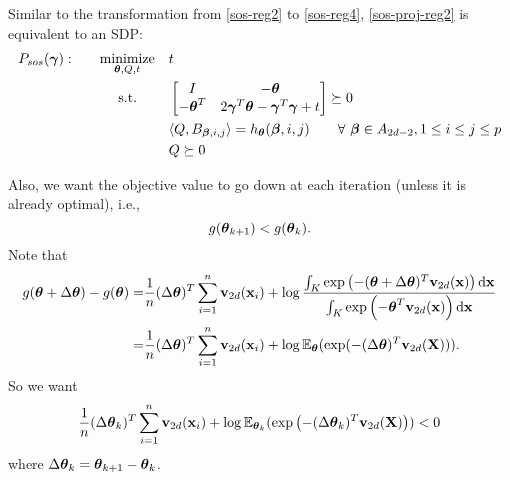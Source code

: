 \documentclass[11pt]{article}
\begin{document}
Similar to the transformation from \eqref{sos-reg2} to \eqref{sos-reg4}, \eqref{sos-proj-reg2} is equivalent to an SDP:
\begin{equation} \label{sos-proj-reg3}
\begin{aligned}
 P_{sos}({\boldsymbol\gamma}): \qquad & \underset{{\boldsymbol\theta}, Q, t}{\text{minimize} }
& & t \\
& \text{\quad\ s.t.}
& & \begin{bmatrix} I & -{\boldsymbol\theta} \\ -{\boldsymbol\theta}^T & 2{\boldsymbol\gamma}^T{\boldsymbol\theta} - {\boldsymbol\gamma}^T{\boldsymbol\gamma} + t \end{bmatrix} \succeq 0 \\
& & & \langle{Q, B_{{\boldsymbol\beta}, i, j}} \rangle = h_{\boldsymbol\theta}({\boldsymbol\beta}, i, j) \qquad \forall\ {\boldsymbol\beta} \in A_{2d - 2}, 1 \le i \le j \le p \\
& & & Q \succeq 0 
\end{aligned}
\end{equation}

Also, we want the objective value to go down at each iteration (unless it is already optimal), i.e.,
$$g({\boldsymbol\theta}_{k + 1}) < g({\boldsymbol\theta}_k).$$
Note that
\begin{align*}
g({\boldsymbol\theta} + \Delta {\boldsymbol\theta}) - g({\boldsymbol\theta}) =& \frac{1}{n} (\Delta {\boldsymbol\theta})^T \sum_{i = 1}^n {\bf v}_{2d}({\bf x}_i) + \log \frac{\int_K \exp\left( -({\boldsymbol\theta}+\Delta{\boldsymbol\theta})^T {\bf v}_{2d}({\bf x}) \right) \text{d}{\bf x}}{\int_K \exp\left( -{\boldsymbol\theta}^T {\bf v}_{2d}({\bf x}) \right) \text{d}{\bf x}}\\
=& \frac{1}{n} (\Delta {\boldsymbol\theta})^T \sum_{i = 1}^n {\bf v}_{2d}({\bf x}_i) + \log \mathbb E_{\boldsymbol\theta} (\exp( -(\Delta {\boldsymbol\theta})^T {\bf v}_{2d}({\bf X}))).
\end{align*}
So we want
\begin{equation} \label{down}
\frac{1}{n} (\Delta {\boldsymbol\theta}_k)^T \sum_{i = 1}^n {\bf v}_{2d}({\bf x}_i) + \log \mathbb E_{{\boldsymbol\theta}_k} (\exp\left( -(\Delta {\boldsymbol\theta}_k)^T {\bf v}_{2d}({\bf X})  \right) ) < 0
\end{equation}
where $\Delta {\boldsymbol\theta}_k = {\boldsymbol\theta}_{k + 1} - {\boldsymbol\theta}_k$.








%
%
\end{document}

